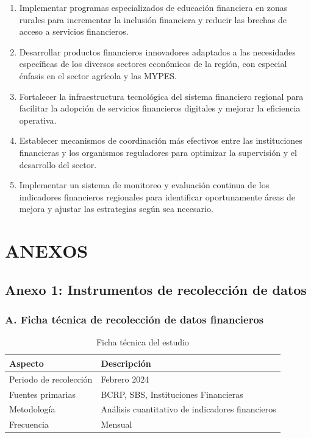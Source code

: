 \documentclass[12pt, a4paper]{article}
\begin{document}
\begin{enumerate}
    \item Implementar programas especializados de educación financiera en zonas rurales para incrementar la inclusión financiera y reducir las brechas de acceso a servicios financieros.

    \item Desarrollar productos financieros innovadores adaptados a las necesidades específicas de los diversos sectores económicos de la región, con especial énfasis en el sector agrícola y las MYPES.

    \item Fortalecer la infraestructura tecnológica del sistema financiero regional para facilitar la adopción de servicios financieros digitales y mejorar la eficiencia operativa.

    \item Establecer mecanismos de coordinación más efectivos entre las instituciones financieras y los organismos reguladores para optimizar la supervisión y el desarrollo del sector.

    \item Implementar un sistema de monitoreo y evaluación continua de los indicadores financieros regionales para identificar oportunamente áreas de mejora y ajustar las estrategias según sea necesario.
\end{enumerate}
\newpage
\printbibliography

\section{ANEXOS}

\subsection*{Anexo 1: Instrumentos de recolección de datos}

\subsubsection*{A. Ficha técnica de recolección de datos financieros}
\begin{table}[ht]
\centering
\begin{tabular}{|l|p{10cm}|}
\hline
\textbf{Aspecto} & \textbf{Descripción} \\
\hline
Periodo de recolección & Febrero 2024 \\
Fuentes primarias & BCRP, SBS, Instituciones Financieras \\
Metodología & Análisis cuantitativo de indicadores financieros \\
Frecuencia & Mensual \\
\hline
\end{tabular}
\caption{Ficha técnica del estudio}
\end{table}
\end{document}
